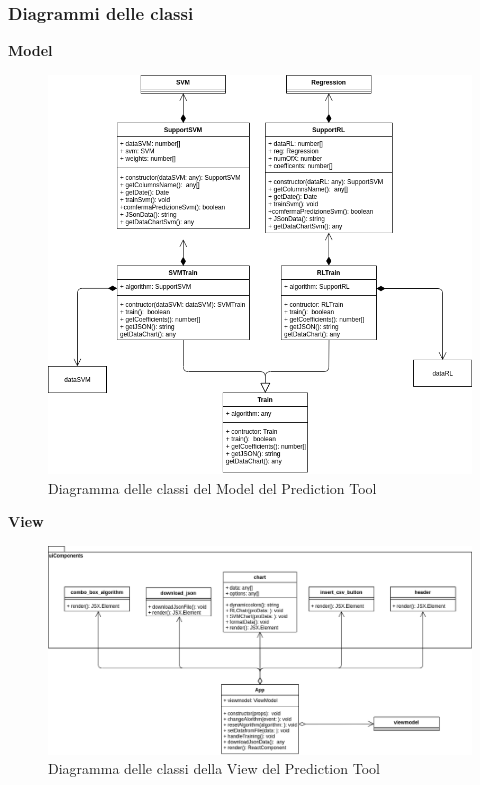 \subsubsection{Diagrammi delle classi}
\textbf{Model}
\begin{figure}[H]
\centering
\includegraphics[scale=0.5]{../../Diagrams/Classes_diagrams/tool_model.png}
\caption{Diagramma delle classi del Model del Prediction Tool}
\end{figure}
\pagebreak
\textbf{View}
\begin{figure}[H]
\centering
\includegraphics[scale=0.45]{../../Diagrams/Classes_diagrams/tool_view.png}
\caption{Diagramma delle classi della View del Prediction Tool}
\end{figure}

